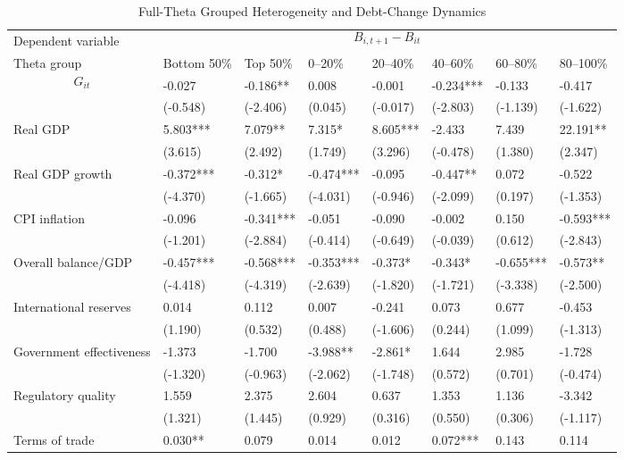 \begin{table}[H]\centering
\begin{threeparttable}
\caption{Full-Theta Grouped Heterogeneity and Debt-Change Dynamics}
\label{tab:theta_group_heterogeneity_debt}
\scriptsize
\begin{tabularx}{\textwidth}{lYYYYYYY}
\toprule
Dependent variable &  \\
\cmidrule(lr){2-8}
Theta group & Bottom 50\% & Top 50\% & 0--20\% & 20--40\% & 40--60\% & 60--80\% & 80--100\% \\
\midrule
$$G_{it}$$ & -0.027 & -0.186** & 0.008 & -0.001 & -0.234*** & -0.133 & -0.417 \\
  & (-0.548) & (-2.406) & (0.045) & (-0.017) & (-2.803) & (-1.139) & (-1.622) \\
Real GDP & 5.803*** & 7.079** & 7.315* & 8.605*** & -2.433 & 7.439 & 22.191** \\
  & (3.615) & (2.492) & (1.749) & (3.296) & (-0.478) & (1.380) & (2.347) \\
Real GDP growth & -0.372*** & -0.312* & -0.474*** & -0.095 & -0.447** & 0.072 & -0.522 \\
  & (-4.370) & (-1.665) & (-4.031) & (-0.946) & (-2.099) & (0.197) & (-1.353) \\
CPI inflation & -0.096 & -0.341*** & -0.051 & -0.090 & -0.002 & 0.150 & -0.593*** \\
  & (-1.201) & (-2.884) & (-0.414) & (-0.649) & (-0.039) & (0.612) & (-2.843) \\
Overall balance/GDP & -0.457*** & -0.568*** & -0.353*** & -0.373* & -0.343* & -0.655*** & -0.573** \\
  & (-4.418) & (-4.319) & (-2.639) & (-1.820) & (-1.721) & (-3.338) & (-2.500) \\
International reserves & 0.014 & 0.112 & 0.007 & -0.241 & 0.073 & 0.677 & -0.453 \\
  & (1.190) & (0.532) & (0.488) & (-1.606) & (0.244) & (1.099) & (-1.313) \\
Government effectiveness & -1.373 & -1.700 & -3.988** & -2.861* & 1.644 & 2.985 & -1.728 \\
  & (-1.320) & (-0.963) & (-2.062) & (-1.748) & (0.572) & (0.701) & (-0.474) \\
Regulatory quality & 1.559 & 2.375 & 2.604 & 0.637 & 1.353 & 1.136 & -3.342 \\
  & (1.321) & (1.445) & (0.929) & (0.316) & (0.550) & (0.306) & (-1.117) \\
Terms of trade & 0.030** & 0.079 & 0.014 & 0.012 & 0.072*** & 0.143 & 0.114 \\

\end{tabularx}
\end{threeparttable}
\end{table}
